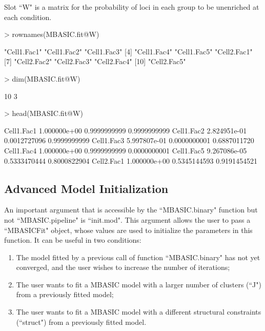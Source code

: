 \documentclass[a4paper,10pt]{article}
\begin{document}
Slot ``W" is a matrix for the probability of loci in each group to be unenriched at each condition.

\begin{Schunk}
\begin{Sinput}
> rownames(MBASIC.fit@W)
\end{Sinput}
\begin{Soutput}
 [1] "Cell1.Fac1" "Cell1.Fac2" "Cell1.Fac3"
 [4] "Cell1.Fac4" "Cell1.Fac5" "Cell2.Fac1"
 [7] "Cell2.Fac2" "Cell2.Fac3" "Cell2.Fac4"
[10] "Cell2.Fac5"
\end{Soutput}
\begin{Sinput}
> dim(MBASIC.fit@W)
\end{Sinput}
\begin{Soutput}
[1] 10  3
\end{Soutput}
\begin{Sinput}
> head(MBASIC.fit@W)
\end{Sinput}
\begin{Soutput}
                   [,1]         [,2]         [,3]
Cell1.Fac1 1.000000e+00 0.9999999999 0.9999999999
Cell1.Fac2 2.824951e-01 0.0012727096 0.9999999999
Cell1.Fac3 5.997807e-01 0.0000000001 0.6887011720
Cell1.Fac4 1.000000e+00 0.9999999999 0.0000000001
Cell1.Fac5 9.267086e-05 0.5333470444 0.8000822904
Cell2.Fac1 1.000000e+00 0.5345144593 0.9191454521
\end{Soutput}
\end{Schunk}

\subsection{Advanced Model Initialization}

An important argument that is accessible by the ``MBASIC.binary" function but not ``MBASIC.pipeline" is ``init.mod". This argument allows the user to pass a ``MBASICFit" object, whose values are used to initialize the parameters in this function. It can be useful in two conditions:

\begin{enumerate}
\item The model fitted by a previous call of function ``MBASIC.binary" has not yet converged, and the user wishes to increase the number of iterations;
\item The user wants to fit a MBASIC model with a larger number of clusters (``J")  from a previously fitted model;
\item The user wants to fit a MBASIC model with a different structural constraints (``struct") from a previously fitted model.
\end{enumerate}
\end{document}
